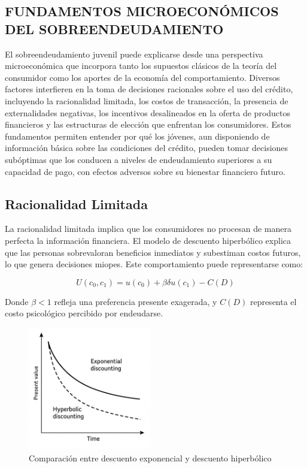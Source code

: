 \documentclass[10pt]{article}
\begin{document}
\begin{multicols}{2}
\section{FUNDAMENTOS MICROECONÓMICOS DEL SOBREENDEUDAMIENTO}

El sobreendeudamiento juvenil puede explicarse desde una perspectiva microeconómica que incorpora tanto los supuestos clásicos de la teoría del consumidor como los aportes de la economía del comportamiento. Diversos factores interfieren en la toma de decisiones racionales sobre el uso del crédito, incluyendo la racionalidad limitada, los costos de transacción, la presencia de externalidades negativas, los incentivos desalineados en la oferta de productos financieros y las estructuras de elección que enfrentan los consumidores. Estos fundamentos permiten entender por qué los jóvenes, aun disponiendo de información básica sobre las condiciones del crédito, pueden tomar decisiones subóptimas que los conducen a niveles de endeudamiento superiores a su capacidad de pago, con efectos adversos sobre su bienestar financiero futuro.


\subsection{Racionalidad Limitada}

La racionalidad limitada implica que los consumidores no procesan de manera perfecta la información financiera. El modelo de descuento hiperbólico explica que las personas sobrevaloran beneficios inmediatos y subestiman costos futuros, lo que genera decisiones miopes. Este comportamiento puede representarse como:

\begin{equation}
U(c_0, c_1) = u(c_0) + \beta \delta u(c_1) - C(D)
\end{equation}

Donde $\beta < 1$ refleja una preferencia presente exagerada, y $C(D)$ representa el costo psicológico percibido por endeudarse.

\begin{figure}[H]
\centering
\includegraphics[width=0.48\textwidth]{descuento_hiperbolico.png}
\caption{Comparación entre descuento exponencial y descuento hiperbólico}
\label{fig:descuento}
\end{figure}




\end{multicols}
\end{document}
